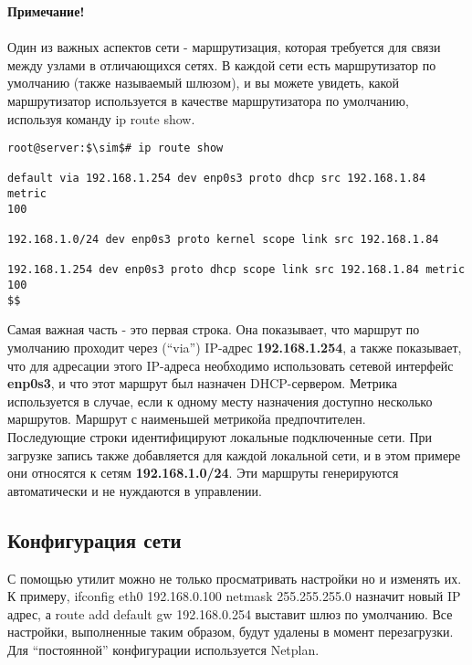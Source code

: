 \documentclass[14pt, a4paper]{article}
\begin{document}
\textbf{Примечание!} \\
\\

Один из важных аспектов сети - маршрутизация, которая требуется для связи между узлами в
отличающихся сетях. В каждой сети есть маршрутизатор по умолчанию (также называемый шлюзом),
и вы можете увидеть, какой маршрутизатор используется в качестве маршрутизатора по умолчанию,
используя команду \colorbox{backcolour}{ip route show}.

\newpage

\begin{lstlisting}
root@server:$\sim$# ip route show

default via 192.168.1.254 dev enp0s3 proto dhcp src 192.168.1.84 metric 
100

192.168.1.0/24 dev enp0s3 proto kernel scope link src 192.168.1.84

192.168.1.254 dev enp0s3 proto dhcp scope link src 192.168.1.84 metric 100
$$
\end{lstlisting}

Самая важная часть - это первая строка. Она показывает, что маршрут по умолчанию проходит через
(“via”) IP-адрес \textbf{192.168.1.254}, а также показывает, что для адресации этого IP-адреса необходимо
использовать сетевой интерфейс \textbf{enp0s3}, и что этот маршрут был назначен DHCP-сервером. Метрика
используется в случае, если к одному месту назначения доступно несколько маршрутов. Маршрут с
наименьшей метрикойа предпочтителен.\\

Последующие строки идентифицируют локальные подключенные сети. При загрузке запись также
добавляется для каждой локальной сети, и в этом примере они относятся к сетям \textbf{192.168.1.0/24}. Эти
маршруты генерируются автоматически и не нуждаются в управлении.

\subsection*{Конфигурация сети} 

С помощью утилит можно не только просматривать настройки но и изменять их. К примеру, \colorbox{backcolour}{ifconfig
eth0 192.168.0.100 netmask 255.255.255.0} назначит новый IP адрес, а \colorbox{backcolour}{route add default
gw 192.168.0.254} выставит шлюз по умолчанию. Все настройки, выполненные таким образом, будут
удалены в момент перезагрузки. Для “постоянной” конфигурации используется Netplan.
\end{document}
